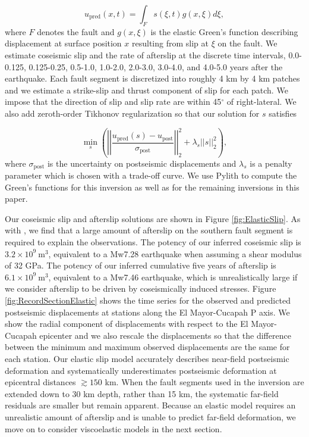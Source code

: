 \documentclass[draft,linenumbers]{AGUJournal}
\begin{document}
\begin{equation}\label{eq:ElasticForward}
  u_\mathrm{pred}(x,t) = \int_F s(\xi,t)g(x,\xi)d\xi, 
\end{equation}           
where $F$ denotes the fault and $g(x,\xi)$ is the elastic Green's function describing displacement at surface position $x$ resulting from slip at $\xi$ on the fault.  We estimate coseismic slip and the rate of afterslip at the discrete time intervals, 0.0-0.125, 0.125-0.25, 0.5-1.0, 1.0-2.0, 2.0-3.0, 3.0-4.0, and 4.0-5.0 years after the earthquake.  Each fault segment is discretized into roughly 4 km by 4 km patches and we estimate a strike-slip and thrust component of slip for each patch. We impose that the direction of slip and slip rate are within 45$^\circ$ of right-lateral. We also add zeroth-order Tikhonov regularization so that our solution for $s$ satisfies

\begin{equation}\label{eq:ElasticObjective}
  \min_s \left(\left|\left|\frac{u_\mathrm{pred}(s) - u_\mathrm{post}}                
                                {\sigma_\mathrm{post}}\right|\right|_2^2 + 
                                \lambda_s||s||_2^2\right),
\end{equation}
where $\sigma_\mathrm{post}$ is the uncertainty on postseismic displacements and $\lambda_s$ is a penalty parameter which is chosen with a trade-off curve.  We use Pylith \citep{Aagaard2013} to compute the Green's functions for this inversion as well as for the remaining inversions in this paper. 

Our coseismic slip and afterslip solutions are shown in Figure \ref{fig:ElasticSlip}.  As with \citet{Rollins2015}, we find that a large amount of afterslip on the southern fault segment is required to explain the observations. The potency of our inferred coseismic slip is $3.2\times10^9\ \mathrm{m}^3$, equivalent to a Mw7.28 earthquake when assuming a shear modulus of 32 GPa.  The potency of our inferred cumulative five years of afterslip is $6.1\times10^9\ \mathrm{m}^3$, equivalent to a Mw7.46 earthquake, which is unrealistically large if we consider afterslip to be driven by coseismically induced stresses.  Figure \ref{fig:RecordSectionElastic} shows the time series for the observed and predicted postseismic displacements at stations along the El Mayor-Cucapah P axis.  We show the radial component of displacements with respect to the El Mayor-Cucapah epicenter and we also rescale the displacements so that the difference between the minimum and maximum observed displacements are the same for each station.  Our elastic slip model accurately describes near-field postseismic deformation and systematically underestimates postseismic deformation at epicentral distances ${\gtrsim}150$ km.  When the fault segments used in the inversion are extended down to 30 km depth, rather than 15 km, the systematic far-field residuals are smaller but remain apparent. Because an elastic model requires an unrealistic amount of afterslip and is unable to predict far-field deformation, we move on to consider viscoelastic models in the next section.  
\end{document}
